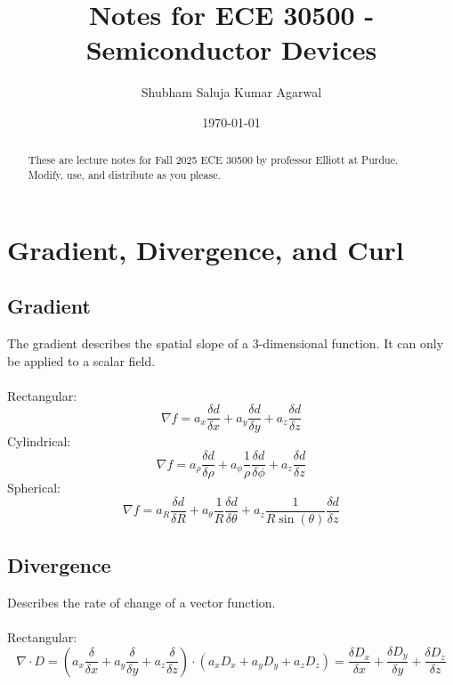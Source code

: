 \documentclass[nobib]{tufte-handout}
\title{Notes for ECE 30500 - Semiconductor Devices}
\author[Shubham Saluja Kumar Agarwal]{Shubham Saluja Kumar Agarwal}
\date{\today}  %
\begin{document}
\maketitle

\begin{abstract}
    These are lecture notes for Fall 2025 ECE 30500 by professor Elliott at Purdue. Modify, use, and distribute as you please.
\end{abstract}

\tableofcontents

\newpage

\section{Gradient, Divergence, and Curl}
\subsection{Gradient}
The gradient describes the spatial slope of a 3-dimensional function. It can only be applied to a scalar field.\\~\\
Rectangular:
\begin{equation*}
    \nabla f = a_x \frac{\delta d}{\delta x}+a_y \frac{\delta d}{\delta y}+a_z \frac{\delta d}{\delta z}
\end{equation*}
Cylindrical:
\begin{equation*}
    \nabla f = a_\rho \frac{\delta d}{\delta \rho}+a_\phi \frac{1}{\rho}\frac{\delta d}{\delta \phi}+a_z \frac{\delta d}{\delta z}
\end{equation*}
Spherical:
\begin{equation*}
    \nabla f = a_R \frac{\delta d}{\delta R}+a_\theta \frac{1}{R}\frac{\delta d}{\delta \theta}+a_z \frac{1}{R\sin(\theta)}\frac{\delta d}{\delta z}
\end{equation*}
\subsection{Divergence}
Describes the rate of change of a vector function.\\~\\
Rectangular:
\begin{equation*}
    \nabla \cdot D = \left(a_x \frac{\delta}{\delta x}+a_y \frac{\delta}{\delta y}+a_z \frac{\delta}{\delta z}\right)\cdot \left(a_x D_x +a_y D_y + a_z D_z\right) = \frac{\delta D_x}{\delta x}+\frac{\delta D_y}{\delta y}+\frac{\delta D_z}{\delta z}
\end{equation*}
\end{document}
